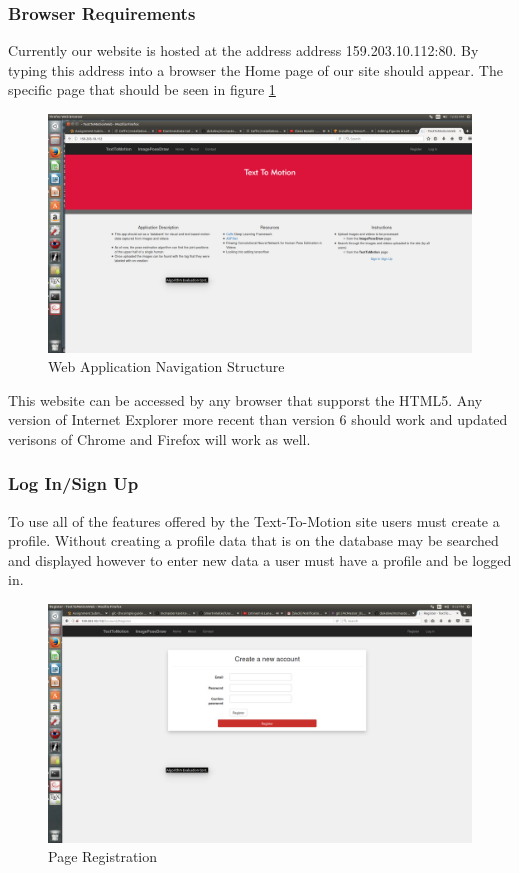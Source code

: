 \documentclass{scrreprt}
\begin{document}
\subsubsection{Browser Requirements}
Currently our website is hosted at the address address 159.203.10.112:80. By typing this address into a browser the Home page of our site should appear. The specific page that should be seen in figure \ref{fig:homePage}

\begin{figure}
  \includegraphics[width=\linewidth]{HomePage.png}
  \caption{Web Application Navigation Structure}
  \label{fig:homePage}
\end{figure}


This website can be accessed by any browser that supporst the HTML5.  Any version of Internet Explorer more recent than version 6 should work and updated verisons of Chrome and Firefox will work as well.

\subsubsection{Log In/Sign Up}
To use all of the features offered by the Text-To-Motion site users must create a profile.  Without creating a profile data that is on the database may be searched and displayed however to enter new data a user must have a profile and be logged in.

\begin{figure}
  \includegraphics[width=\linewidth]{Register.png}
  \caption{Page Registration}
  \label{fig:regPage}
\end{figure}
\end{document}
